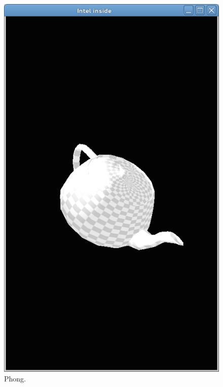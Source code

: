 \begin{figure}
  \includegraphics[width=\linewidth]{img/imgphong.png}
  \caption[Phong benchmark screen capture]{Phong.}
  \label{fig:benchmarks_phong}
  \endminipage
\end{figure}

